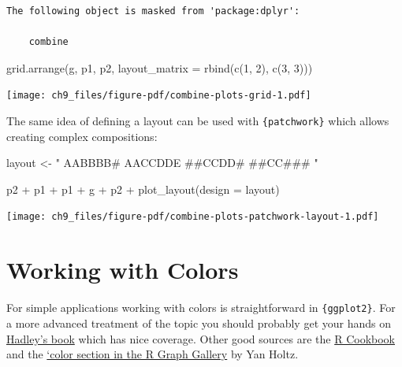 \documentclass[
  letterpaper,
  DIV=11,
  numbers=noendperiod]{scrreprt}
\newenvironment{Shaded}{\begin{snugshade}}{\end{snugshade}}
\newcommand{\AttributeTok}[1]{\textcolor[rgb]{0.40,0.45,0.13}{#1}}
\newcommand{\DecValTok}[1]{\textcolor[rgb]{0.68,0.00,0.00}{#1}}
\newcommand{\FunctionTok}[1]{\textcolor[rgb]{0.28,0.35,0.67}{#1}}
\newcommand{\NormalTok}[1]{\textcolor[rgb]{0.00,0.23,0.31}{#1}}
\newcommand{\OtherTok}[1]{\textcolor[rgb]{0.00,0.23,0.31}{#1}}
\newcommand{\SpecialCharTok}[1]{\textcolor[rgb]{0.37,0.37,0.37}{#1}}
\newcommand{\StringTok}[1]{\textcolor[rgb]{0.13,0.47,0.30}{#1}}
\begin{document}
\begin{verbatim}
The following object is masked from 'package:dplyr':

    combine
\end{verbatim}

\begin{Shaded}
\begin{Highlighting}[]
\FunctionTok{grid.arrange}\NormalTok{(g, p1, p2,}
             \AttributeTok{layout\_matrix =} \FunctionTok{rbind}\NormalTok{(}\FunctionTok{c}\NormalTok{(}\DecValTok{1}\NormalTok{, }\DecValTok{2}\NormalTok{), }\FunctionTok{c}\NormalTok{(}\DecValTok{3}\NormalTok{, }\DecValTok{3}\NormalTok{)))}
\end{Highlighting}
\end{Shaded}

\texttt{[image: ch9\_files/figure-pdf/combine-plots-grid-1.pdf]}

The same idea of defining a layout can be used with
\texttt{\{patchwork\}} which allows creating complex compositions:

\begin{Shaded}
\begin{Highlighting}[]
\NormalTok{layout }\OtherTok{\textless{}{-}} \StringTok{"}
\StringTok{AABBBB\#}
\StringTok{AACCDDE}
\StringTok{\#\#CCDD\#}
\StringTok{\#\#CC\#\#\#}
\StringTok{"}

\NormalTok{p2 }\SpecialCharTok{+}\NormalTok{ p1 }\SpecialCharTok{+}\NormalTok{ p1 }\SpecialCharTok{+}\NormalTok{ g }\SpecialCharTok{+}\NormalTok{ p2 }\SpecialCharTok{+}
  \FunctionTok{plot\_layout}\NormalTok{(}\AttributeTok{design =}\NormalTok{ layout)}
\end{Highlighting}
\end{Shaded}

\texttt{[image: ch9\_files/figure-pdf/combine-plots-patchwork-layout-1.pdf]}


\chapter{Working with Colors}\label{colors}

For simple applications working with colors is straightforward in
\texttt{\{ggplot2\}}. For a more advanced treatment of the topic you
should probably get your hands on
\href{http://www.springer.com/de/book/9780387981413\#otherversion=9780387981406}{Hadley's
book} which has nice coverage. Other good sources are the
\href{http://www.cookbook-r.com/Graphs/Colors_(ggplot2)/}{R Cookbook}
and the \href{https://www.r-graph-gallery.com/ggplot2-color.html}{`color
section in the R Graph Gallery} by Yan Holtz.
\end{document}
